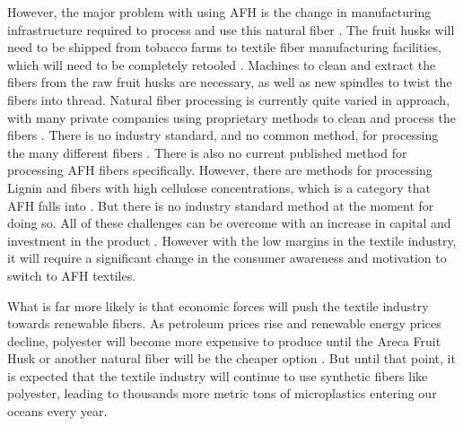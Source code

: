 \documentclass{article}
\begin{document}
However, the major problem with using AFH is the change in manufacturing infrastructure required to process and use this natural fiber \autocite{afhfiber}. The fruit husks will need to be shipped from tobacco farms to textile fiber manufacturing facilities, which will need to be completely retooled \autocite{afhfiber}. Machines to clean and extract the fibers from the raw fruit husks are necessary, as well as new spindles to twist the fibers into thread. Natural fiber processing is currently quite varied in approach, with many private companies using proprietary methods to clean and process the fibers \autocite{afhfiber}. There is no industry standard, and no common method, for processing the many different fibers \autocite{afhfiber}. There is also no current published method for processing AFH fibers specifically. However, there are methods for processing Lignin and fibers with high cellulose concentrations, which is a category that AFH falls into \autocite{afhfiber}. But there is no industry standard method at the moment for doing so. All of these challenges can be overcome with an increase in capital and investment in the product \autocite{afhfiber}. However with the low margins in the textile industry, it will require a significant change in the consumer awareness and motivation to switch to AFH textiles.

What is far more likely is that economic forces will push the textile industry towards renewable fibers. As petroleum prices rise and renewable energy prices decline, polyester will become more expensive to produce until the Areca Fruit Husk or another natural fiber will be the cheaper option \autocite{afhfiber}. But until that point, it is expected that the textile industry will continue to use synthetic fibers like polyester, leading to thousands more metric tons of microplastics entering our oceans every year.


\printbibliography
\end{document}
